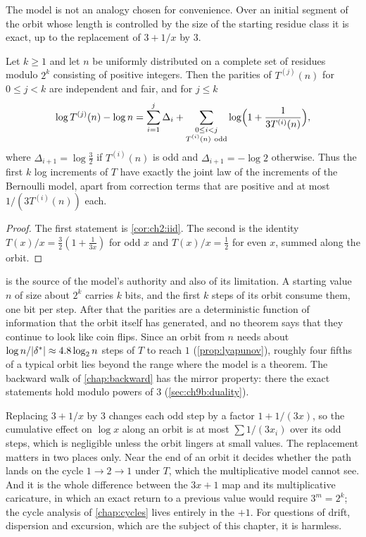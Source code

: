 The model is not an analogy chosen for convenience. Over an initial segment of
the orbit whose length is controlled by the size of the starting residue class
it is exact, up to the replacement of $3+1/x$ by $3$.

\begin{proposition}\label{prop:ch3:exact}
Let $k\geq1$ and let $n$ be uniformly distributed on a complete set of residues
modulo $2^k$ consisting of positive integers. Then the parities of $T^{(j)}(n)$
for $0\leq j<k$ are independent and fair, and for $j\leq k$
\[
  \log T^{(j)}(n)-\log n=\sum_{i=1}^{j}\Delta_i+\sum_{\substack{0\le i<j\\
  T^{(i)}(n)\ \mathrm{odd}}}\log\Bigl(1+\frac{1}{3T^{(i)}(n)}\Bigr),
\]
where $\Delta_{i+1}=\log\frac32$ if $T^{(i)}(n)$ is odd and $\Delta_{i+1}=-\log2$
otherwise. Thus the first $k$ log increments of $T$ have exactly the joint law
of the increments of the Bernoulli model, apart from correction terms that are
positive and at most $1/(3T^{(i)}(n))$ each.
\end{proposition}

\begin{proof}
The first statement is \cref{cor:ch2:iid}. The second is the identity
$T(x)/x=\tfrac32(1+\tfrac1{3x})$ for odd $x$ and $T(x)/x=\tfrac12$ for even
$x$, summed along the orbit.
\end{proof}

 is the source of the model's authority and also of its
limitation. A starting value $n$ of size about $2^k$ carries $k$ bits, and the
first $k$ steps of its orbit consume them, one bit per step. After that the
parities are a deterministic function of information that the orbit itself
has generated, and no theorem says that they continue to look like coin flips.
Since an orbit from $n$ needs about $\log n/|\delta^{*}|\approx4.8\log_2n$ steps of
$T$ to reach $1$ (\cref{prop:lyapunov}), roughly four fifths of a typical orbit lies beyond the range
where the model is a theorem. The backward walk of \cref{chap:backward} has the mirror property: there the exact statements hold modulo powers of $3$ (\cref{sec:ch9b:duality}).

\begin{remark}\label{rem:ch3:plusone}
Replacing $3+1/x$ by $3$ changes each odd step by a factor
$1+1/(3x)$, so the cumulative effect on $\log x$ along an orbit is
at most $\sum1/(3x_i)$ over its odd steps, which is negligible unless the orbit lingers at small
values. The replacement matters in two places only. Near the end of an orbit
it decides whether the path lands on the cycle $1\to2\to1$ under $T$, which the
multiplicative model cannot see. And it is the whole difference between the
$3x+1$ map and its multiplicative caricature, in which an exact return to a
previous value would require $3^m=2^k$; the cycle analysis of
\cref{chap:cycles} lives entirely in the $+1$. For questions of drift, dispersion and excursion, which are the
subject of this chapter, it is harmless.
\end{remark}

